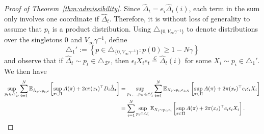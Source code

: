\documentclass{article}
\begin{document}
\begin{proof}[Proof of Theorem~\ref{thm:admissibility}]
Since $\hat\Delta_t = e_i \hat\Delta_t(i)$, each term in the sum only involves one coordinate if $\hat\Delta_t$. Therefore, it is without loss of generality to assume that $p_t$ is a product distribution. Using $\triangle_{\{0,V_\infty \gamma^{-1}\}}$ to denote distributions over the singletons $0$ and $V_\infty\gamma^{-1}$, define 
\[
  \triangle_1' := \left\{ p \in \triangle_{\{0,V_\infty \gamma^{-1}\}}: p(0)\geq 1-N\gamma\right\}
\]
and observe that if $\hat\Delta_t\sim p_t\in\triangle_{\mathcal D'}$, then $\epsilon_i X_i e_t \stackrel{\mathcal L}{=} \hat\Delta_t(i)$ for some $X_i\sim p_i\in\triangle_1'$. We then have 
\begin{align*}
  \sup_{p_t\in\triangle_{\mathcal D}'}
    \sum_{i=1}^N \mathbb E_{\hat\Delta_t\sim p_t,\epsilon}\left[
        \sup_{\pi\in\Pi} A(\pi)+
        2\epsilon\pi(x_t)^\top D_i \hat\Delta_t
  \right]
  &=
      \sup_{p_1,\ldots,p_N \in\triangle_1'}
    \sum_{i=1}^N \mathbb E_{X_i\sim p_i,\epsilon_{1:N}}\left[
        \sup_{\pi\in\Pi} A(\pi)+
        2\pi(x_t)^\top e_i \epsilon_i X_i
    \right]\\
      &=
        \sum_{i=1}^N
        \sup_{p_i \in\triangle_1'}
        \mathbb E_{X_i\sim p_i,\epsilon_i}\left[
        \sup_{\pi\in\Pi} A(\pi)+
        2\pi(x_t)^\top e_i \epsilon_i X_i
    \right].
\end{align*}


\end{proof}
\end{document}

